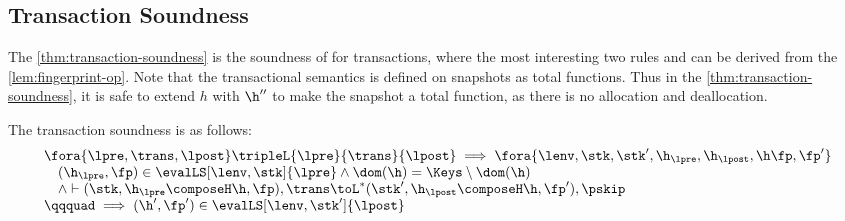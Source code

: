 \subsection{Transaction Soundness}

The \cref{thm:transaction-soundness} is the soundness of for transactions, where the most interesting two rules  and  can be derived from the \cref{lem:fingerprint-op}.
Note that the transactional semantics is defined on snapshots as total functions.
Thus in the \cref{thm:transaction-soundness}, it is safe to extend \( h \) with \( \h'' \)  to make the snapshot a total function, as there is no allocation and deallocation.

\begin{theorem}
\label{thm:transaction-soundness}
The transaction soundness is as follows:
\[
    \begin{array}{@{}l@{}}
        \fora{ \lpre, \trans, \lpost } \tripleL{\lpre}{\trans}{\lpost}
        \implies 
        \fora{\lenv, \stk, \stk', \h_\lpre, \h_\lpost, \h \fp, \fp' }  \\
        \quad (\h_\lpre, \fp) \in \evalLS[\lenv, \stk]{\lpre}
        \land \dom(\h) = \Keys \setminus \dom(\h) \\
        \quad {} \land \vdash (\stk, \h_\lpre \composeH \h, \fp ), \trans \toL^{*}  (\stk', \h_\lpost \composeH \h, \fp' ), \pskip  \\
        \qqquad \implies (\h', \fp') \in \evalLS[\lenv, \stk']{\lpost}
    \end{array}
\]
\end{theorem}
